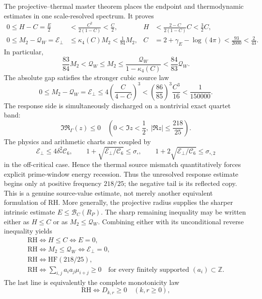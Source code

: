 \documentclass[11pt]{article}
\begin{document}
The projective--thermal master theorem places the endpoint and thermodynamic estimates in one
scale-resolved spectrum.  It proves
\[
 \begin{aligned}
 0\le H-C=\frac E2
 &<\frac{C^2}{2(1-C)}<\frac C2,
 &H&<\frac{2-C}{2(1-C)}C<\frac32C,\\
 0\le M_2-\mathcal Q_W=\mathcal E_\perp
 &\le\kappa_4(C)M_2<\frac1{84}M_2,
 &C&=2+\gamma_{\!E}-\log(4\pi)<\frac{93}{2000}<\frac2{43}.
 \end{aligned}
 \tag{11.1}
\]
In particular,
\[
 \frac{83}{84}M_2<\mathcal Q_W\le M_2
 \le\frac{\mathcal Q_W}{1-\kappa_4(C)}
 <\frac{84}{83}\mathcal Q_W.
 \tag{11.2}
\]
The absolute gap satisfies the stronger cubic source law
\[
 0\le M_2-\mathcal Q_W=\mathcal E_\perp
 \le4\left(\frac{C}{4-C}\right)^3
 <\left(\frac{86}{85}\right)^3\frac{C^3}{16}
 <\frac1{150000}.
 \tag{11.2a}
\]
The response side is simultaneously discharged on a nontrivial exact quartet band:
\[
 \Im\mathfrak R_\Gamma(z)\le0
 \quad\left(0<\Im z<\frac12,\ |\Re z|\le\frac{218}{25}\right).
 \tag{11.2b}
\]
The physics and arithmetic charts are coupled by
\[
 \mathcal E_\perp\le4\delta_*^2\mathcal C_6,
 \qquad
 1+\sqrt{\mathcal E_\perp/\mathcal C_6}\le\sigma_\square,
 \qquad
 1+2\sqrt{\mathcal E_\perp/\mathcal C_6}\le\sigma_{\square,2}
 \tag{11.2c}
\]
in the off-critical case.  Hence the thermal source mismatch quantitatively forces explicit
prime-window energy recession.
Thus the unresolved response estimate begins only at positive frequency $218/25$; the negative
tail is its reflected copy.  This is a genuine source-value estimate, not merely another
equivalent formulation of RH.
More generally, the projective radius supplies the sharper intrinsic estimate
$E\le\mathcal B_C(R_P)$.  The sharp remaining inequality may be written either as $H\le C$ or as
$M_2\le\mathcal Q_W$.  Combining either with its unconditional reverse inequality yields
\[
 \boxed{\begin{gathered}
 \mathrm{RH}\Longleftrightarrow H\le C\Longleftrightarrow E=0,\\
 \mathrm{RH}\Longleftrightarrow M_2\le\mathcal Q_W
 \Longleftrightarrow\mathcal E_\perp=0,\\
 \mathrm{RH}\Longleftrightarrow\mathrm{HF}(218/25),\\
 \mathrm{RH}\Longleftrightarrow
 \sum_{i,j}a_i a_j\mu_{i+j}\ge0
 \quad\text{for every finitely supported }(a_i)\subset\mathbb Z.
 \end{gathered}}
 \tag{11.3}
\]
The last line is equivalently the complete monotonicity law
\[
 \mathrm{RH}\Longleftrightarrow D_{k,r}\ge0\quad(k,r\ge0),
 \tag{11.3a}
\]
\end{document}
